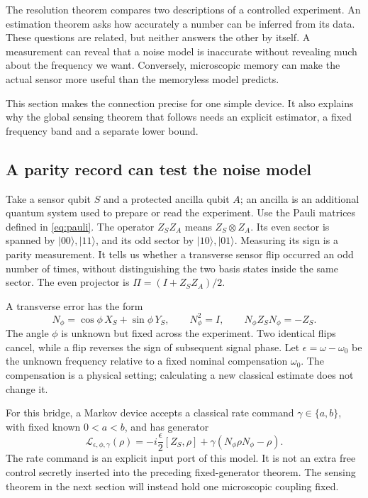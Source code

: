 \documentclass[11pt,a4paper]{article}
\numberwithin{equation}{section}
\theoremstyle{remark}
\begin{document}
The resolution theorem compares two descriptions of a controlled experiment.
An estimation theorem asks how accurately a number can be inferred from its
data. These questions are related, but neither answers the other by itself.
A measurement can reveal that a noise model is inaccurate without revealing
much about the frequency we want. Conversely, microscopic memory can make
the actual sensor more useful than the memoryless model predicts.

This section makes the connection precise for one simple device. It also
explains why the global sensing theorem that follows needs an explicit
estimator, a fixed frequency band and a separate lower bound.

\subsection{A parity record can test the noise model}

Take a sensor qubit $S$ and a protected ancilla qubit $A$; an ancilla
is an additional quantum system used to prepare or read the experiment.
Use the Pauli matrices defined in \eqref{eq:pauli}.
The operator $Z_SZ_A$ means $Z_S\otimes Z_A$. Its even sector is spanned
by $|00\rangle,|11\rangle$, and its odd sector by $|10\rangle,|01\rangle$.
Measuring its sign is a parity measurement. It tells us whether a transverse
sensor flip occurred an odd number of times, without distinguishing the
two basis states inside the same sector. The even projector is
$\Pi=(I+Z_SZ_A)/2$.

A transverse error has the form
\begin{equation}
 N_\phi=\cos\phi\,X_S+\sin\phi\,Y_S,
 \qquad N_\phi^2=I,
 \qquad N_\phi Z_S N_\phi=-Z_S.
\end{equation}
The angle $\phi$ is unknown but fixed across the experiment. Two identical
flips cancel, while a flip reverses the sign of subsequent signal phase.
Let $\epsilon=\omega-\omega_0$ be the unknown frequency relative to a fixed
nominal compensation $\omega_0$. The compensation is a physical setting;
calculating a new classical estimate does not change it.

For this bridge, a Markov device accepts a classical rate command
$\gamma\in\{a,b\}$, with fixed known $0<a<b$, and has generator
\begin{equation}
 \mathcal L_{\epsilon,\phi,\gamma}(\rho)
 =-i\frac\epsilon2[Z_S,\rho]
 +\gamma(N_\phi\rho N_\phi-\rho).
 \label{bridge:markov-model}
\end{equation}
The rate command is an explicit input port of this model. It is not an
extra free control secretly inserted into the preceding fixed-generator
theorem. The sensing theorem in the next section will instead hold one
microscopic coupling fixed.
\end{document}
